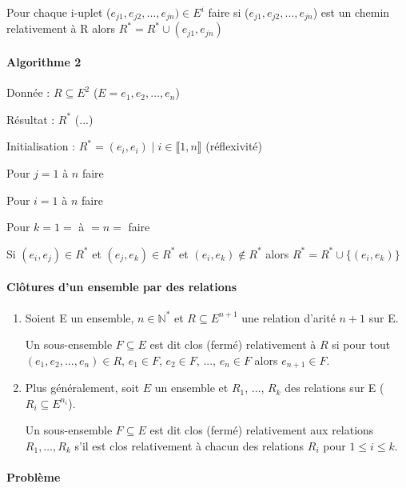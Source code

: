 \documentclass[12pt, a4paper]{report}
\begin{document}
  Pour chaque i-uplet ($e_{j1}, e_{j2}, \dots, e_{jn}) \in E^i$ faire
     si ($e_{j1}, e_{j2}, \dots, e_{jn}$) est un chemin relativement à R alors
     $R^{*} = R^{*} \cup { (e_{j1}, e_{jn})}$


\paragraph{Algorithme 2}

Donnée : $R \subseteq E^{2}$ ($ E = {e_1, e_2, \dots, e_n}$)

Résultat : $R^{*}$ (...)

Initialisation : $R^{*} = {(e_i,e_i)\mid i\in \llbracket 1,n\rrbracket}$ (réflexivité)

Pour $j = 1$ à $n$ faire

  Pour $i = 1$ à $n$ faire

    Pour $k = 1=$ à $=n=$ faire

      Si $(e_i, e_j)\in R^{*}$ et $(e_j, e_k)\in R^{*}$ et $(e_i,e_k) \not\in R^{*}$
      alors $R^{*} = R^{*}\cup \{(e_i,e_k)\}$


\paragraph{Clôtures d'un ensemble par des relations}

\begin{enumerate}
  \item Soient E un ensemble, $n \in \mathbb{N}^{*}$ et $R \subseteq E^{n+1}$
  une relation d'arité $n+1$ sur E.
  
  Un sous-ensemble $F \subseteq E$ est dit clos (fermé) relativement à $R$ si pour
  tout $(e_1, e_2, \dots, e_n) \in R$, $e_1 \in F$, $e_2 \in F$, ..., $e_n \in F$
  alors $e_{n+1} \in F$.

  \item Plus généralement, soit $E$ un ensemble et $R_1$, $\dots$, $R_k$ des relations
  sur E ($R_i \subseteq E^{n_i}$).

  Un sous-ensemble $F \subseteq E$ est dit clos (fermé) relativement aux relations 
  $R_1, \dots, R_k$ s'il est clos relativement à chacun des relations $R_i$ pour
  $1 \leq i \leq k$.
\end{enumerate}


\paragraph{Problème}
\end{document}
